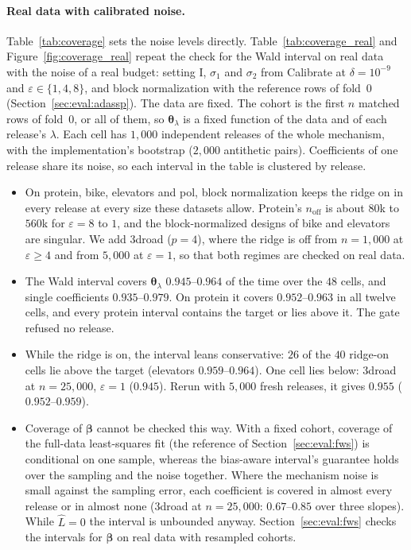 \documentclass[11pt]{article}
\theoremstyle{definition}
\theoremstyle{plain}
\newcommand{\bbeta}{\boldsymbol{\beta}}
\newcommand{\btheta}{\boldsymbol{\theta}}
\begin{document}
\paragraph{Real data with calibrated noise.} Table~\ref{tab:coverage} sets the noise levels directly. Table~\ref{tab:coverage_real} and Figure~\ref{fig:coverage_real} repeat the check for the Wald interval on real data with the noise of a real budget: setting I, $\sigma_1$ and $\sigma_2$ from Calibrate at $\delta = 10^{-9}$ and $\varepsilon \in \{1, 4, 8\}$, and block normalization with the reference rows of fold~0 (Section~\ref{sec:eval:adassp}). The data are fixed. The cohort is the first $n$ matched rows of fold~0, or all of them, so $\btheta_\lambda$ is a fixed function of the data and of each release's $\lambda$. Each cell has $1{,}000$ independent releases of the whole mechanism, with the implementation's bootstrap ($2{,}000$ antithetic pairs). Coefficients of one release share its noise, so each interval in the table is clustered by release.
\begin{itemize}[noitemsep]
  \item On protein, bike, elevators and pol, block normalization keeps the ridge on in every release at every size these datasets allow. Protein's $n_{\mathrm{off}}$ is about $80$k to $560$k for $\varepsilon = 8$ to $1$, and the block-normalized designs of bike and elevators are singular. We add 3droad ($p = 4$), where the ridge is off from $n = 1{,}000$ at $\varepsilon \ge 4$ and from $5{,}000$ at $\varepsilon = 1$, so that both regimes are checked on real data.
  \item The Wald interval covers $\btheta_\lambda$ $0.945$--$0.964$ of the time over the $48$ cells, and single coefficients $0.935$--$0.979$. On protein it covers $0.952$--$0.963$ in all twelve cells, and every protein interval contains the target or lies above it. The gate refused no release.
  \item While the ridge is on, the interval leans conservative: $26$ of the $40$ ridge-on cells lie above the target (elevators $0.959$--$0.964$). One cell lies below: 3droad at $n = 25{,}000$, $\varepsilon = 1$ ($0.945$). Rerun with $5{,}000$ fresh releases, it gives $0.955$ ($0.952$--$0.959$).
  \item Coverage of $\bbeta$ cannot be checked this way. With a fixed cohort, coverage of the full-data least-squares fit (the reference of Section~\ref{sec:eval:fws}) is conditional on one sample, whereas the bias-aware interval's guarantee holds over the sampling and the noise together. Where the mechanism noise is small against the sampling error, each coefficient is covered in almost every release or in almost none (3droad at $n = 25{,}000$: $0.67$--$0.85$ over three slopes). While $\hat L = 0$ the interval is unbounded anyway. Section~\ref{sec:eval:fws} checks the intervals for $\bbeta$ on real data with resampled cohorts.
\end{itemize}
\end{document}

